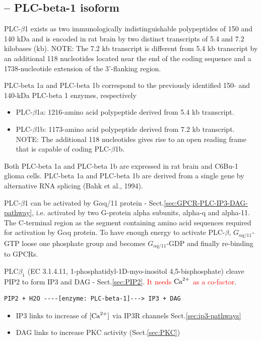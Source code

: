 
\subsection{-- PLC-beta-1 isoform}

PLC-$\beta$1 exists as two immunologically indistinguishable polypeptides of 150
and 140 kDa and is encoded in rat brain by two distinct transcripts of 5.4 and
7.2 kilobases (kb). NOTE: The 7.2 kb transcript is different from 5.4 kb
transcript by an additional 118 nucleotides located near the end of the coding
sequence and a 1738-nucleotide extension of the 3'-flanking region.

PLC-beta 1a and PLC-beta 1b correspond to the previously identified 150- and
140-kDa PLC-beta 1 enzymes, respectively
\begin{itemize}
  \item PLC-$\beta$1a: 1216-amino acid polypeptide derived from 5.4 kb
  transcript. 

  \item PLC-$\beta$1b:  1173-amino acid polypeptide derived from 7.2 kb
  transcript. NOTE: The additional 118 nucleotides gives rise to an open reading
  frame that is capable of coding PLC-$\beta$1b.

\end{itemize}
Both PLC-beta 1a and PLC-beta 1b are expressed in rat brain and C6Bu-1 glioma
cells.    PLC-beta 1a and PLC-beta 1b are derived from a single gene by
alternative RNA splicing (Bahk et al., 1994).

PLC-$\beta$1 can be activated by G$\alpha$q/11 protein -
Sect.\ref{sec:GPCR-PLC-IP3-DAG-pathway}, i.e. activated by two G-protein alpha
subunits, alpha-q and alpha-11. The C-terminal region as the segment containing
amino acid sequences required for activation by G$\alpha$q protein.
To have enough energy to activate PLC-$\beta$, $G_{\alpha q/11}$-GTP loose one
phosphate group and becomes $G_{\alpha q/11}$-GDP and finally re-binding to
GPCRs.

  
PLC$\beta_1$ (EC 3.1.4.11, 1-phosphatidyl-1D-myo-inositol
  4,5-bisphosphate) cleave PIP2 to form IP3 and DAG - Sect.\ref{sec:PIP2}.
  \textcolor{red}{ It  needs ${\text{Ca}^{2+}}$ as a co-factor}. 

\begin{verbatim}
PIP2 + H2O ----[enzyme: PLC-beta-1]---> IP3 + DAG 
\end{verbatim}
\begin{itemize}
  \item IP3 links to increase of $[{\text{Ca}^{2+}}]$ via IP3R channels Sect.\ref{sec:ip3-pathways}
  \item DAG links to increase PKC activity (Sect.\ref{sec:PKC})
\end{itemize}


